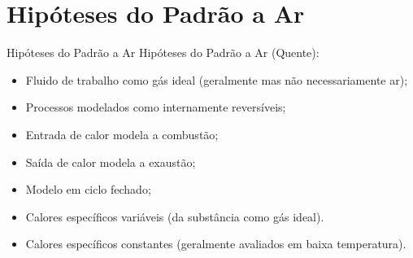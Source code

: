 \section{Hipóteses do Padrão a Ar}

    \begin{frame}{Hipóteses do Padrão a Ar}\vspace*{-1em}
        Hipóteses do Padrão a Ar (Quente):

        \begin{itemize}
            \item<1->  Fluido de trabalho como \alert{gás ideal} (geralmente mas não
                necessariamente \alert{ar});
            \item<1->  Processos modelados como \alert{internamente reversíveis};
            \item<1->  Entrada de \alert{calor} modela a combustão;
            \item<2->  Saída de \alert{calor} modela a exaustão;
            \item<2->  Modelo em \alert{ciclo fechado};
            \item<2->  Calores específicos \alert{variáveis} (da substância como gás ideal).
        \end{itemize}
        \vspace*\medskipamount

        
        \begin{itemize}
            \item<3->  Calores específicos \alert{constantes} (geralmente avaliados em
                \alert{baixa temperatura}).
        \end{itemize}
    \end{frame}

